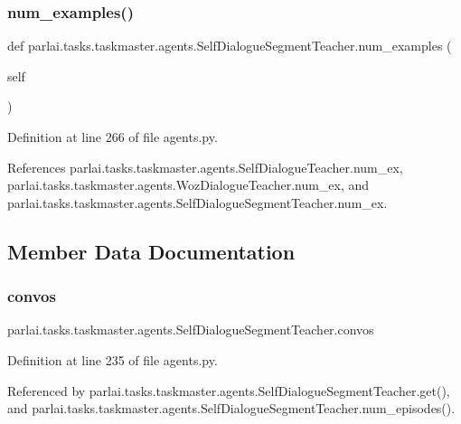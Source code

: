 \subsubsection{\texorpdfstring{num\+\_\+examples()}{num\_examples()}}
{\footnotesize\ttfamily def parlai.\+tasks.\+taskmaster.\+agents.\+Self\+Dialogue\+Segment\+Teacher.\+num\+\_\+examples (\begin{DoxyParamCaption}\item[{}]{self }\end{DoxyParamCaption})}



Definition at line 266 of file agents.\+py.



References parlai.\+tasks.\+taskmaster.\+agents.\+Self\+Dialogue\+Teacher.\+num\+\_\+ex, parlai.\+tasks.\+taskmaster.\+agents.\+Woz\+Dialogue\+Teacher.\+num\+\_\+ex, and parlai.\+tasks.\+taskmaster.\+agents.\+Self\+Dialogue\+Segment\+Teacher.\+num\+\_\+ex.



\subsection{Member Data Documentation}
\mbox{\label{classparlai_1_1tasks_1_1taskmaster_1_1agents_1_1SelfDialogueSegmentTeacher_aced6b44c6ab5da0943ebd6f16acc5339}} 
\subsubsection{\texorpdfstring{convos}{convos}}
{\footnotesize\ttfamily parlai.\+tasks.\+taskmaster.\+agents.\+Self\+Dialogue\+Segment\+Teacher.\+convos}



Definition at line 235 of file agents.\+py.



Referenced by parlai.\+tasks.\+taskmaster.\+agents.\+Self\+Dialogue\+Segment\+Teacher.\+get(), and parlai.\+tasks.\+taskmaster.\+agents.\+Self\+Dialogue\+Segment\+Teacher.\+num\+\_\+episodes().

